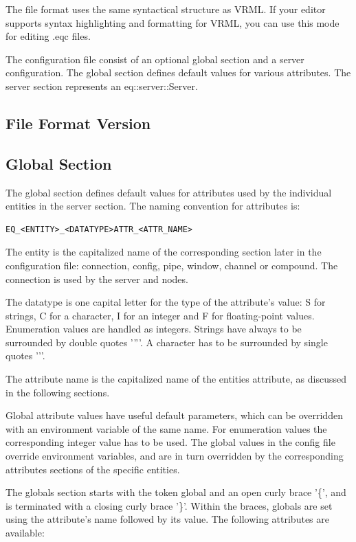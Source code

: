 \documentclass[10pt,a4]{scrartcl}
\begin{document}
The file format uses the same syntactical structure as VRML. If your
editor supports syntax highlighting and formatting for VRML, you can use
this mode for editing \textsf{.eqc} files.

The configuration file consist of an optional global section and a
server configuration. The global section defines default values for
various attributes. The server section represents an
\textsf{eq::server::Server}.


\subsection{File Format Version}

\subsection{\label{sGlobal}Global Section}

The global section defines default values for attributes used by the
individual entities in the server section. The naming convention for
attributes is:

{\footnotesize\begin{lstlisting}
EQ_<ENTITY>_<DATATYPE>ATTR_<ATTR_NAME>
\end{lstlisting}}

The entity is the capitalized name of the corresponding section later in
the configuration file: connection, config, pipe, window, channel or
compound. The connection is used by the server and nodes.

The datatype is one capital letter for the type of the attribute's
value: \textsf{S} for strings, \textsf{C} for a character, \textsf{I}
for an integer and \textsf{F} for floating-point values. Enumeration
values are handled as integers. Strings have always to be surrounded by
double quotes '\textsf{''}'. A character has to be surrounded by single
quotes '\textsf{'}'.

The attribute name is the capitalized name of the entities attribute, as
discussed in the following sections.

Global attribute values have useful default parameters, which can be
overridden with an environment variable of the same name. For enumeration
values the corresponding integer value has to be used. The global values
in the config file override environment variables, and are in turn
overridden by the corresponding attributes sections of the specific
entities.

The globals section starts with the token \textsf{global} and an open
curly brace '\textsf{\{}', and is terminated with a closing curly brace
'\textsf{\}}'. Within the braces, globals are set using the attribute's
name followed by its value. The following attributes are available:
\end{document}
